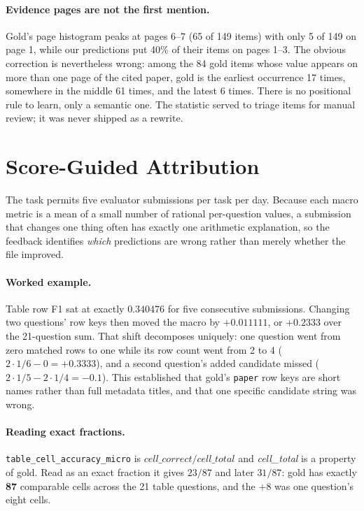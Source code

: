 \documentclass[11pt]{article}
\newcommand{\bk}{\allowbreak}
\begin{document}
\paragraph{Evidence pages are not the first mention.}
Gold's page histogram peaks at pages 6--7 (65 of 149 items) with only 5 of 149 on
page 1, while our predictions put 40\% of their items on pages 1--3. The obvious
correction is nevertheless wrong: among the 84 gold items whose value appears on
more than one page of the cited paper, gold is the earliest occurrence 17 times,
somewhere in the middle 61 times, and the latest 6 times. There is no positional rule to learn, only a semantic
one. The statistic served to triage items for manual review; it was never shipped
as a rewrite.

\section{Score-Guided Attribution}
\label{sec:attribution}

The task permits five evaluator submissions per task per day. Because each macro
metric is a mean of a small number of rational per-question values, a submission
that changes one thing often has exactly one arithmetic explanation, so the
feedback identifies \emph{which} predictions are wrong rather than merely whether
the file improved.

\paragraph{Worked example.}
Table row F1 sat at exactly $0.340476$ for five consecutive submissions.
Changing two questions' row keys then moved the macro by $+0.011111$, or
$+0.2333$ over the 21-question sum. That shift decomposes uniquely: one question went from
zero matched rows to one while its row count went from 2 to 4
($2{\cdot}1/6 - 0 = +0.3333$), and a second question's added candidate missed
($2{\cdot}1/5 - 2{\cdot}1/4 = -0.1$). This established that gold's \texttt{paper}
row keys are short names rather than full metadata titles, and that one specific
candidate string was wrong.

\paragraph{Reading exact fractions.}
\texttt{table\_\bk{}cell\_\bk{}accuracy\_\bk{}micro} is $\textit{cell\_correct}/\textit{cell\_total}$
and \textit{cell\_total} is a property of gold. Read as an exact fraction it gives
$23/87$ and later $31/87$: gold has exactly \textbf{87} comparable cells across
the 21 table questions, and the $+8$ was one question's eight cells.
\end{document}
